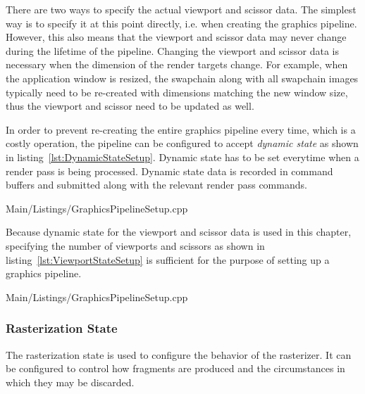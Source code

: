         There are two ways to specify the actual viewport and scissor data.
        The simplest way is to specify it at this point directly, i.e. when creating the graphics pipeline.
        However, this also means that the viewport and scissor data may never change during the lifetime of the pipeline.
        Changing the viewport and scissor data is necessary when the dimension of the render targets change.
        For example, when the application window is resized, the swapchain along with all swapchain images typically need to be re-created with dimensions matching the new window size, thus the viewport and scissor need to be updated as well.

        In order to prevent re-creating the entire graphics pipeline every time, which is a costly operation, the pipeline can be configured to accept \textit{dynamic state} as shown in listing~\ref{lst:DynamicStateSetup}.
        Dynamic state has to be set everytime when a render pass is being processed.
        Dynamic state data is recorded in command buffers and submitted along with the relevant render pass commands.

        
        {Main/Listings/GraphicsPipelineSetup.cpp}

        Because dynamic state for the viewport and scissor data is used in this chapter, specifying the number of viewports and scissors as shown in listing~\ref{lst:ViewportStateSetup} is sufficient for the purpose of setting up a graphics pipeline.

        
        {Main/Listings/GraphicsPipelineSetup.cpp}

      \subsubsection{Rasterization State}
        The rasterization state is used to configure the behavior of the rasterizer.
        It can be configured to control how fragments are produced and the circumstances in which they may be discarded.

